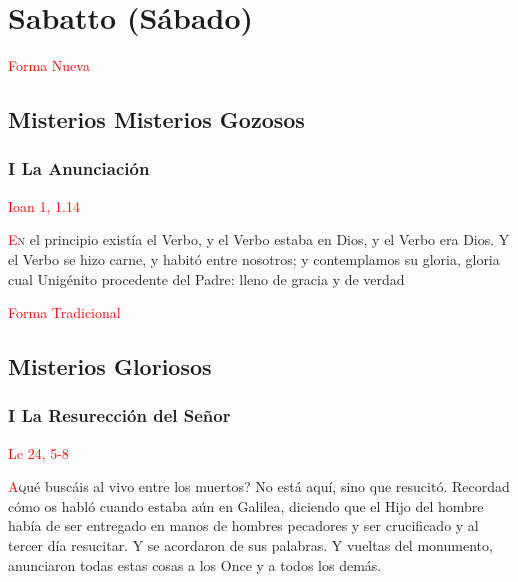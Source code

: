\documentclass[10pt,twoside]{book}
\begin{document}
\section*{\centering Sabatto (Sábado)}

\begin{paracol}{2}
      \begin{leftcolumn}
            \begin{center}
                  \textcolor{red}{Forma Nueva}
                  \subsection*{Misterios Misterios Gozosos}

                  \subsubsection*{I La Anunciación}
                  \textcolor{red}{Ioan 1, 1.14}

            \end{center}

            \lettrine[lines=2]{\textcolor{red}{E}}n el principio existía el Verbo, y el Verbo estaba en Dios, y el Verbo era Dios. Y el Verbo se hizo
            carne, y habitó entre nosotros; y contemplamos su gloria, gloria cual Unigénito procedente del Padre: lleno de gracia y de verdad

      \end{leftcolumn}
      \begin{rightcolumn}
            \begin{center}
                  \textcolor{red}{Forma Tradicional}
                  \subsection*{Misterios Gloriosos}
                  
                  \subsubsection*{I La Resurección del Señor}
                  \textcolor{red}{Lc 24, 5-8}
            \end{center}

            \lettrine[lines=2, ante={?`}]{\textcolor{red}{A}} qué buscáis al vivo entre los muertos? No está aquí, sino que resucitó. Recordad cómo
            os habló cuando estaba aún en Galilea, diciendo que el Hijo del hombre había de ser entregado en manos de hombres pecadores y ser crucificado
            y al tercer día resucitar. Y se acordaron de sus palabras. Y vueltas del monumento, anunciaron todas estas cosas a los Once y a todos los demás.
      \end{rightcolumn}
\end{paracol}
\end{document}
